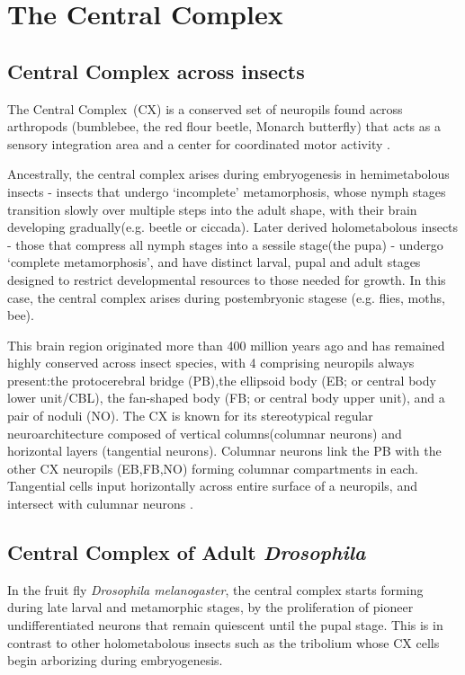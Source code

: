 \section{The Central Complex}

    \subsection{Central Complex across insects}
    
        The Central Complex~(CX) is a conserved set of neuropils found across arthropods (bumblebee, the red flour beetle, Monarch butterfly) that acts as a sensory integration area and a center for coordinated motor activity \citep{PfeifferHomberg2014, turnerevans2016CX, heinze2024variations}.

        Ancestrally, the central complex arises during embryogenesis in hemimetabolous insects - insects that undergo ‘incomplete’ metamorphosis, whose nymph stages transition slowly over multiple steps into the adult shape, with their brain developing gradually(e.g. beetle or ciccada).
        Later derived holometabolous insects - those that compress all nymph stages into a sessile stage(the pupa) -  undergo ‘complete metamorphosis’, and have distinct larval, pupal and adult stages designed to restrict developmental resources to those needed for growth. In this case, the central complex arises during  postembryonic stagese (e.g. flies, moths, bee).

        This brain region originated more than 400 million years ago and has remained highly conserved across insect species, with 4 comprising neuropils always present:the protocerebral bridge (PB),the ellipsoid body (EB; or central body lower unit/CBL), the fan-shaped body (FB; or central body upper unit), and a pair of noduli (NO). The CX is known for its stereotypical regular neuroarchitecture composed of vertical columns(columnar neurons) and horizontal layers (tangential neurons). Columnar neurons link the PB with the other CX neuropils (EB,FB,NO) forming columnar compartments in each. Tangential cells input horizontally across entire surface of a neuropils, and intersect with culumnar neurons \citep{honkanen2019insect}. 


    \subsection{Central Complex of Adult \textit{Drosophila}}
        In the fruit fly \textit{Drosophila melanogaster}, the central complex starts forming during late larval and metamorphic stages, by the proliferation of pioneer undifferentiated neurons that remain quiescent until the pupal stage. This is in contrast to other holometabolous insects such as the tribolium \citep{farnworth2022atlas} whose CX cells begin arborizing during embryogenesis.

